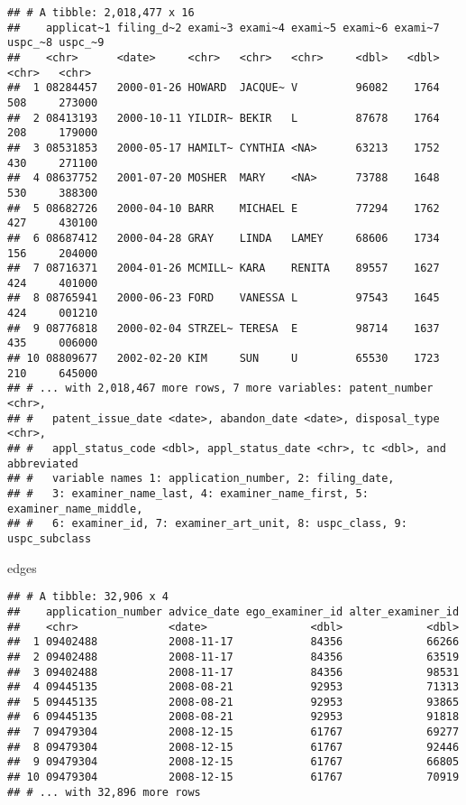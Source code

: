 \documentclass[
]{article}
\newenvironment{Shaded}{\begin{snugshade}}{\end{snugshade}}
\newcommand{\NormalTok}[1]{#1}
\begin{document}
\begin{verbatim}
## # A tibble: 2,018,477 x 16
##    applicat~1 filing_d~2 exami~3 exami~4 exami~5 exami~6 exami~7 uspc_~8 uspc_~9
##    <chr>      <date>     <chr>   <chr>   <chr>     <dbl>   <dbl> <chr>   <chr>  
##  1 08284457   2000-01-26 HOWARD  JACQUE~ V         96082    1764 508     273000 
##  2 08413193   2000-10-11 YILDIR~ BEKIR   L         87678    1764 208     179000 
##  3 08531853   2000-05-17 HAMILT~ CYNTHIA <NA>      63213    1752 430     271100 
##  4 08637752   2001-07-20 MOSHER  MARY    <NA>      73788    1648 530     388300 
##  5 08682726   2000-04-10 BARR    MICHAEL E         77294    1762 427     430100 
##  6 08687412   2000-04-28 GRAY    LINDA   LAMEY     68606    1734 156     204000 
##  7 08716371   2004-01-26 MCMILL~ KARA    RENITA    89557    1627 424     401000 
##  8 08765941   2000-06-23 FORD    VANESSA L         97543    1645 424     001210 
##  9 08776818   2000-02-04 STRZEL~ TERESA  E         98714    1637 435     006000 
## 10 08809677   2002-02-20 KIM     SUN     U         65530    1723 210     645000 
## # ... with 2,018,467 more rows, 7 more variables: patent_number <chr>,
## #   patent_issue_date <date>, abandon_date <date>, disposal_type <chr>,
## #   appl_status_code <dbl>, appl_status_date <chr>, tc <dbl>, and abbreviated
## #   variable names 1: application_number, 2: filing_date,
## #   3: examiner_name_last, 4: examiner_name_first, 5: examiner_name_middle,
## #   6: examiner_id, 7: examiner_art_unit, 8: uspc_class, 9: uspc_subclass
\end{verbatim}

\begin{Shaded}
\begin{Highlighting}[]
\NormalTok{edges}
\end{Highlighting}
\end{Shaded}

\begin{verbatim}
## # A tibble: 32,906 x 4
##    application_number advice_date ego_examiner_id alter_examiner_id
##    <chr>              <date>                <dbl>             <dbl>
##  1 09402488           2008-11-17            84356             66266
##  2 09402488           2008-11-17            84356             63519
##  3 09402488           2008-11-17            84356             98531
##  4 09445135           2008-08-21            92953             71313
##  5 09445135           2008-08-21            92953             93865
##  6 09445135           2008-08-21            92953             91818
##  7 09479304           2008-12-15            61767             69277
##  8 09479304           2008-12-15            61767             92446
##  9 09479304           2008-12-15            61767             66805
## 10 09479304           2008-12-15            61767             70919
## # ... with 32,896 more rows
\end{verbatim}
\end{document}
